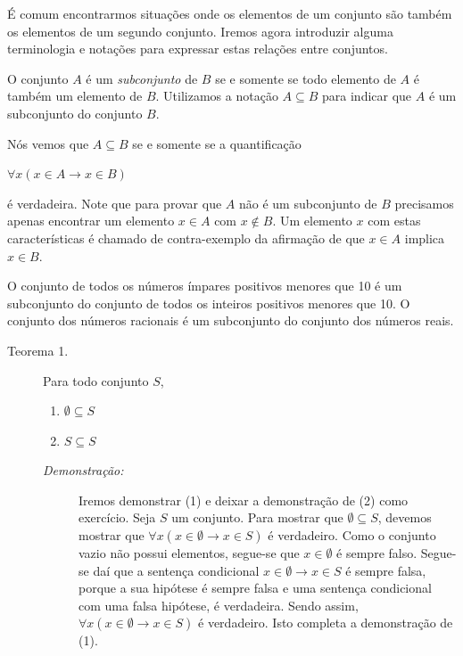 É comum encontrarmos situações onde os elementos de um conjunto são também os
elementos de um segundo conjunto. Iremos agora introduzir alguma terminologia e
notações para expressar estas relações entre conjuntos.

\begin{defn}
\label{def33}
O conjunto $A$ é um \emph{subconjunto} de $B$ se e somente se todo elemento de
$A$ é também um elemento de $B$. Utilizamos a notação $A \subseteq B$
para indicar que $A$ é um subconjunto do conjunto $B$.
\end{defn}

Nós vemos que $A \subseteq B$ se e somente se a quantificação
\begin{center}$\forall x (x \in A \to x \in B)$\end{center}
\noindent é verdadeira. Note que para provar que $A$ não é um subconjunto de $B$
precisamos apenas encontrar um elemento $x \in A$ com $x \notin B$. Um elemento
$x$ com estas características é chamado de contra-exemplo da afirmação de que
$x \in A$ implica $x \in B$.

\begin{exmp}
\label{exem37}
O conjunto de todos os números ímpares positivos menores que 10 é um subconjunto
do conjunto de todos os inteiros positivos menores que 10. O conjunto dos
números racionais é um subconjunto do conjunto dos números reais.
\end{exmp}

\begin{description}
\item[Teorema 1.] Para todo conjunto $S$,
\begin{enumerate}
  \item $\emptyset \subseteq S$
  \item $S \subseteq S$
\end{enumerate}

\begin{description}
\item[\emph{Demonstração:}] Iremos demonstrar (1) e deixar a demonstração de (2)
como exercício. Seja $S$ um conjunto. Para mostrar que $\emptyset \subseteq S$,
devemos mostrar que $\forall x(x \in \emptyset \to x \in S)$ é verdadeiro. Como
o conjunto vazio não possui elementos, segue-se que $x \in \emptyset$ é sempre
falso. Segue-se daí que a sentença condicional $x \in \emptyset \to x \in S$ é
sempre falsa, porque a sua hipótese é sempre falsa e uma sentença condicional
com uma falsa hipótese, é verdadeira. Sendo assim, $\forall x(x \in \emptyset
\to x \in S)$ é verdadeiro. Isto completa a demonstração de (1).

\end{description}
\end{description}

